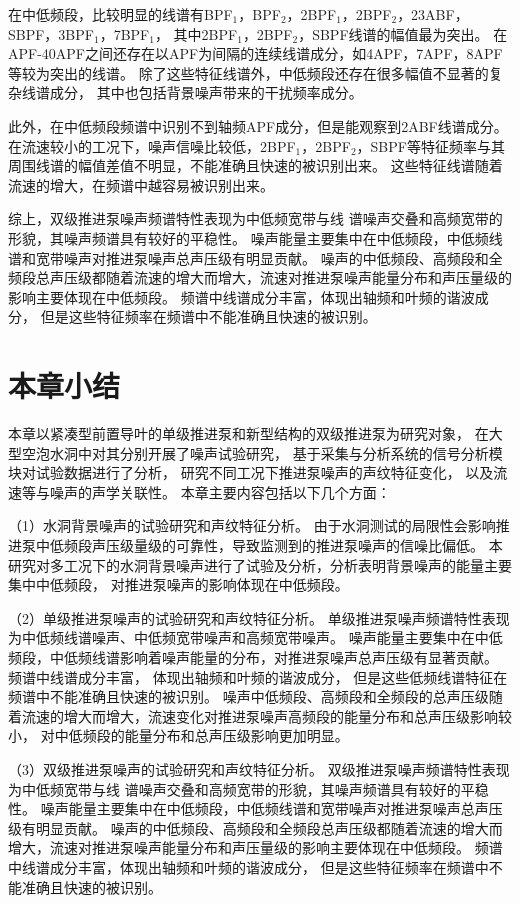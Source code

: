 在中低频段，比较明显的线谱有BPF$_1$，BPF$_2$，2BPF$_1$，2BPF$_2$，23ABF，SBPF，3BPF$_1$，7BPF$_1$，
其中2BPF$_1$，2BPF$_2$，SBPF线谱的幅值最为突出。
在APF-40APF之间还存在以APF为间隔的连续线谱成分，如4APF，7APF，8APF等较为突出的线谱。
除了这些特征线谱外，中低频段还存在很多幅值不显著的复杂线谱成分，
其中也包括背景噪声带来的干扰频率成分。

此外，在中低频段频谱中识别不到轴频APF成分，但是能观察到2ABF线谱成分。
在流速较小的工况下，噪声信噪比较低，2BPF$_1$，2BPF$_2$，SBPF等特征频率与其周围线谱的幅值差值不明显，不能准确且快速的被识别出来。
这些特征线谱随着流速的增大，在频谱中越容易被识别出来。

综上，双级推进泵噪声频谱特性表现为中低频宽带与线
谱噪声交叠和高频宽带的形貌，其噪声频谱具有较好的平稳性。
噪声能量主要集中在中低频段，中低频线谱和宽带噪声对推进泵噪声总声压级有明显贡献。
噪声的中低频段、高频段和全频段总声压级都随着流速的增大而增大，流速对推进泵噪声能量分布和声压量级的影响主要体现在中低频段。
频谱中线谱成分丰富，体现出轴频和叶频的谐波成分，
但是这些特征频率在频谱中不能准确且快速的被识别。

\section{本章小结}
本章以紧凑型前置导叶的单级推进泵和新型结构的双级推进泵为研究对象，
在大型空泡水洞中对其分别开展了噪声试验研究，
基于采集与分析系统的信号分析模块对试验数据进行了分析，
研究不同工况下推进泵噪声的声纹特征变化，
以及流速等与噪声的声学关联性。
本章主要内容包括以下几个方面：

（1）水洞背景噪声的试验研究和声纹特征分析。
由于水洞测试的局限性会影响推进泵中低频段声压级量级的可靠性，导致监测到的推进泵噪声的信噪比偏低。
本研究对多工况下的水洞背景噪声进行了试验及分析，分析表明背景噪声的能量主要集中中低频段，
对推进泵噪声的影响体现在中低频段。

（2）单级推进泵噪声的试验研究和声纹特征分析。
单级推进泵噪声频谱特性表现为中低频线谱噪声、中低频宽带噪声和高频宽带噪声。
噪声能量主要集中在中低频段，中低频线谱影响着噪声能量的分布，对推进泵噪声总声压级有显著贡献。
频谱中线谱成分丰富，
体现出轴频和叶频的谐波成分，
但是这些低频线谱特征在频谱中不能准确且快速的被识别。
噪声中低频段、高频段和全频段的总声压级随着流速的增大而增大，流速变化对推进泵噪声高频段的能量分布和总声压级影响较小，
对中低频段的能量分布和总声压级影响更加明显。

（3）双级推进泵噪声的试验研究和声纹特征分析。
双级推进泵噪声频谱特性表现为中低频宽带与线
谱噪声交叠和高频宽带的形貌，其噪声频谱具有较好的平稳性。
噪声能量主要集中在中低频段，中低频线谱和宽带噪声对推进泵噪声总声压级有明显贡献。
噪声的中低频段、高频段和全频段总声压级都随着流速的增大而增大，流速对推进泵噪声能量分布和声压量级的影响主要体现在中低频段。
频谱中线谱成分丰富，体现出轴频和叶频的谐波成分，
但是这些特征频率在频谱中不能准确且快速的被识别。


